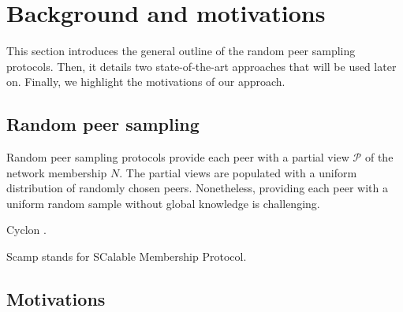 
\section{Background and motivations}
\label{sec:background}

This section introduces the general outline of the random peer sampling
protocols. Then, it details two state-of-the-art approaches that will be used
later on. Finally, we highlight the motivations of our approach.

\subsection{Random peer sampling}
Random peer sampling protocols provide each peer with a partial view
$\mathcal{P}$ of the network membership $N$. The partial views are populated
with a uniform distribution of randomly chosen peers. Nonetheless, providing
each peer with a uniform random sample without global knowledge is challenging.

\begin{asparadesc}
\item [Cyclon].
\end{asparadesc}

\begin{asparadesc}
\item [Scamp] stands for SCalable Membership Protocol.
\end{asparadesc}

\subsection{Motivations}


